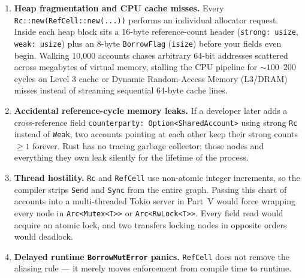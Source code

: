 \begin{enumerate}
  \item \textbf{Heap fragmentation and CPU cache misses.} Every \texttt{Rc::new(RefCell::new(...))} performs an individual allocator request. Inside each heap block sits a 16-byte reference-count header (\texttt{strong: usize}, \texttt{weak: usize}) plus an 8-byte \texttt{BorrowFlag} (\texttt{isize}) before your fields even begin. Walking 10,000 accounts chases arbitrary 64-bit addresses scattered across megabytes of virtual memory, stalling the CPU pipeline for $\sim 100\text{--}200$ cycles on Level 3 cache or Dynamic Random-Access Memory (L3/DRAM) misses instead of streaming sequential 64-byte cache lines.
  \item \textbf{Accidental reference-cycle memory leaks.} If a developer later adds a cross-reference field \texttt{counterparty:\allowbreak\ Option<SharedAccount>} using strong \texttt{Rc} instead of \texttt{Weak}, two accounts pointing at each other keep their strong counts $\ge 1$ forever. Rust has no tracing garbage collector; those nodes and everything they own leak silently for the lifetime of the process.
  \item \textbf{Thread hostility.} \texttt{Rc} and \texttt{RefCell} use non-atomic integer increments, so the compiler strips \texttt{Send} and \texttt{Sync} from the entire graph. Passing this chart of accounts into a multi-threaded Tokio server in Part~V would force wrapping every node in \texttt{Arc<Mutex<T>>} or \texttt{Arc<RwLock<T>>}. Every field read would acquire an atomic lock, and two transfers locking nodes in opposite orders would deadlock.
  \item \textbf{Delayed runtime \texttt{BorrowMutError} panics.} \texttt{RefCell} does not remove the aliasing rule --- it merely moves enforcement from compile time to runtime.
\end{enumerate}

